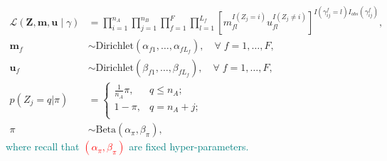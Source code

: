 \documentclass[ba]{imsart}
\begin{document}
\begin{subequations}
\begin{align}
	\mathcal{L}(\bm{Z}, \bm{m}, \bm{u} \mid \gamma) &= \prod_{i=1}^{n_A}  \prod_{j=1}^{n_B}\prod_{f=1}^{F}\prod_{l=1}^{L_f}\left[  m_{fl}^{I(Z_j = i)}u_{fl}^{I(Z_j \neq i)}\right]^{I(\gamma_{ij}^f = l)I_{obs}(\gamma_{ij}^f)}, \label{eqn:likelihood}\\
	\bm{m}_f &\sim \text{Dirichlet}(\alpha_{f1}, \ldots, \alpha_{f L_f}),\quad  \forall  \; f = 1, \ldots, F, \label{eqn:m} \\
	\bm{u}_f &\sim \text{Dirichlet}(\beta_{f1}, \ldots, \beta_{f L_f}), \quad \forall \; f = 1, \ldots, F,  \label{eqn:u}\\
	p(Z_j = q| \pi)  &=
	\begin{cases} 
		\frac{1}{n_A}\pi,  & q \leq n_A; \\
		1-\pi, &  q  = n_A + j; \\
	\end{cases} \label{eqn:z}\\
	\pi &\sim \text{Beta}(\alpha_{\pi}, \beta_{\pi})\label{eqn:pi-prior},
\end{align}
\end{subequations}
\textcolor{teal}{where recall that \textcolor{red}{$(\alpha_{\pi}, \beta_{\pi})$} are fixed hyper-parameters.} 











\end{document}
